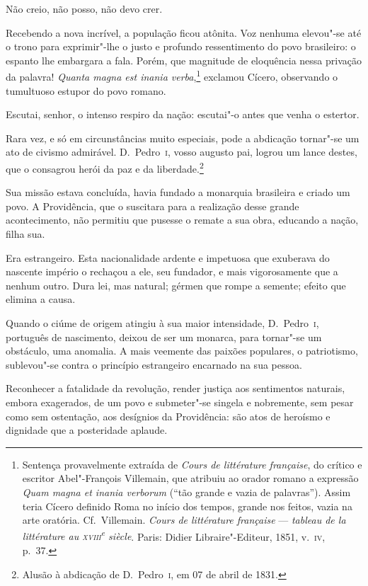 Não creio, não posso, não devo crer. 

Recebendo a nova incrível, a população ficou atônita. Voz nenhuma
elevou"-se até o trono para exprimir"-lhe o justo e profundo
ressentimento do povo brasileiro: o espanto lhe embargara a fala.
Porém, que magnitude de eloquência nessa privação da palavra!
\textit{Quanta magna est inania
verba},\footnote{ Sentença provavelmente extraída de
 \textit{Cours de littérature française}, do crítico e escritor Abel"-François Villemain, 
que atribuiu ao orador romano a expressão \textit{Quam magna et inania verborum} 
(``tão grande e vazia de palavras''). Assim teria Cícero definido Roma no início dos tempos, 
grande nos feitos, vazia na arte oratória. Cf.~Villemain. \textit{Cours de littérature
française} --- \textit{tableau de la littérature au \textsc{xviii}\textsuperscript{e} siècle}.
Paris: Didier Libraire"-Editeur, 1851, v.~\textsc{iv}, p.~37.} 
exclamou Cícero, observando o tumultuoso estupor do povo romano. 

 Escutai, senhor, o intenso respiro da nação: escutai"-o antes que venha o estertor. 

 Rara vez, e só em circunstâncias muito especiais, pode a abdicação
tornar"-se um ato de civismo admirável. D.~Pedro~\textsc{i}, vosso augusto pai,
logrou um lance destes, que o consagrou herói da paz e da
liberdade.\footnote{ Alusão à abdicação de D.~Pedro~\textsc{i}, em 07 de abril de 1831.}
 

 Sua missão estava concluída, havia fundado a monarquia brasileira e
criado um povo. A Providência, que o suscitara para a realização desse
grande acontecimento, não permitiu que pusesse o remate a sua obra,
educando a nação, filha sua. 

 Era estrangeiro. Esta nacionalidade ardente e impetuosa que exuberava
do nascente império o rechaçou a ele, seu fundador, e mais
vigorosamente que a nenhum outro. Dura lei, mas natural; gérmen que
rompe a semente; efeito que elimina a causa. 

 Quando o ciúme de origem atingiu à sua maior intensidade, D.~Pedro~\textsc{i},
português de nascimento, deixou de ser um monarca, para tornar"-se um
obstáculo, uma anomalia. A mais veemente das paixões populares, o
patriotismo, sublevou"-se contra o princípio estrangeiro encarnado na sua pessoa.

 Reconhecer a fatalidade da revolução, render justiça aos sentimentos
naturais, embora exagerados, de um povo e submeter"-se singela e
nobremente, sem pesar como sem ostentação, aos desígnios da
Providência: são atos de heroísmo e dignidade que a posteridade aplaude. 

